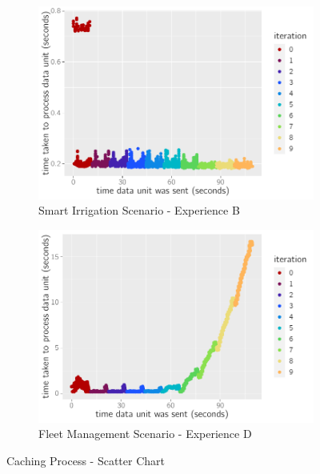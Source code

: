 \begin{figure}[H]
    \centering
    \begin{subfigure}[b]{0.45\textwidth}
        \centering
        \includegraphics[page=1,width=\columnwidth]{assets/charts/s2eB.pdf}
        \caption[Smart Irrigation Scenario - Experience B]{Smart Irrigation Scenario - Experience B}
        \label{fig:evaluation:overview:cache:chart:s2eB}
    \end{subfigure}
    \hfill
    \begin{subfigure}[b]{0.45\textwidth}
        \centering
        \includegraphics[page=1,width=\columnwidth]{assets/charts/s1eD.pdf}
        \caption[Fleet Management Scenario - Experience D]{Fleet Management Scenario - Experience D}
        \label{fig:evaluation:overview:cache:chart:s1eD}
    \end{subfigure}
       \caption[Data Flow Caching Process - Scatter Chart]{Caching Process - Scatter Chart}
       \label{fig:evaluation:overview:cache:chart}
 \end{figure}


